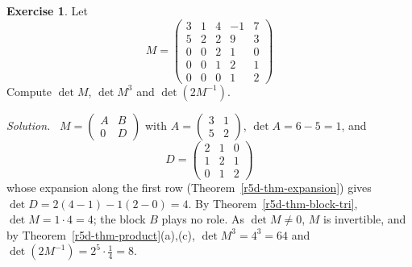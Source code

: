 \documentclass[12pt]{article}
\theoremstyle{definition}
\newtheorem{exercise}{Exercise}
\newenvironment{solution}{\par\noindent\textit{Solution.}\ }{\par\smallskip}
\begin{document}
\begin{exercise}\label{r5d-ex-block-tri-det}
Let
\[
M=\left(\begin{array}{cc|ccc}3&1&4&-1&7\\5&2&2&9&3\\\hline0&0&2&1&0\\0&0&1&2&1\\0&0&0&1&2\end{array}\right)
\]
Compute \(\det M\), \(\det M^3\) and \(\det(2M^{-1})\).
\end{exercise}
\begin{solution}
\(M=\left(\begin{smallmatrix}A&B\\0&D\end{smallmatrix}\right)\) with
\(A=\left(\begin{smallmatrix}3&1\\5&2\end{smallmatrix}\right)\), \(\det A=6-5=1\), and
\[
D=\begin{pmatrix}2&1&0\\1&2&1\\0&1&2\end{pmatrix}
\]
whose expansion along the first row (Theorem~\ref{r5d-thm-expansion}) gives \(\det D=2(4-1)-1(2-0)=4\). By Theorem~\ref{r5d-thm-block-tri},
\(\det M=1\cdot4=4\); the block \(B\) plays no role. As \(\det M\ne0\), \(M\) is invertible, and by
Theorem~\ref{r5d-thm-product}(a),(c),
\(\det M^3=4^3=64\) and \(\det(2M^{-1})=2^5\cdot\frac14=8\).
\end{solution}
\end{document}
